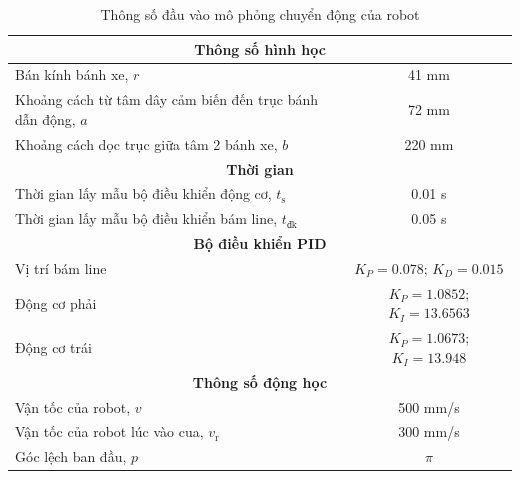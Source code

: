                \begin{table}[h]
                    \centering
                    \begin{tabular}{|l|c|}
                    \hline
                    \multicolumn{2}{|c|}{\textbf{Thông số hình học}} \\
                    \hline
                    Bán kính bánh xe, $r$ & 41 mm \\
                    \hline
                    Khoảng cách từ tâm dây cảm biến đến trục bánh dẫn động, $a$ & 72 mm \\
                    \hline
                    Khoảng cách dọc trục giữa tâm 2 bánh xe, $b$ & 220 mm \\
                    \hline
                    \multicolumn{2}{|c|}{\textbf{Thời gian}} \\
                    \hline
                    Thời gian lấy mẫu bộ điều khiển động cơ, $t_{\text{s}}$ & 0.01 s \\
                    \hline
                    Thời gian lấy mẫu bộ điều khiển bám line, $t_{\text{đk}}$ & 0.05 s \\
                    \hline
                    \multicolumn{2}{|c|}{\textbf{Bộ điều khiển PID}} \\
                    \hline
                    Vị trí bám line & $K_P = 0.078$; $K_D = 0.015$ \\
                    \hline
                    Động cơ phải & $K_P = 1.0852$; $K_I = 13.6563$ \\
                    \hline
                    Động cơ trái & $K_P = 1.0673$; $K_I = 13.948$ \\
                    \hline
                    \multicolumn{2}{|c|}{\textbf{Thông số động học}} \\
                    \hline
                    Vận tốc của robot, $v$ & 500 mm/s \\
                    \hline
                    Vận tốc của robot lúc vào cua, $v_{\text{r}}$ & 300 mm/s \\
                    \hline
                    Góc lệch ban đầu, $p$ & $\pi$ \\
                    \hline
                    \end{tabular}
                    \label{tab:robot_specifications}
                    \caption{Thông số đầu vào mô phỏng chuyển động của robot}
               \end{table}
